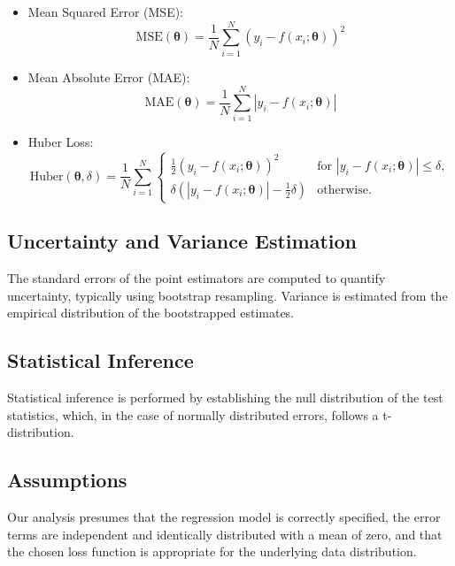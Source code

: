 \documentclass[12pt]{article}
\begin{document}
\begin{itemize}
  \item Mean Squared Error (MSE):
  \begin{equation}
    \text{MSE}(\boldsymbol{\theta}) = \frac{1}{N} \sum_{i=1}^{N} (y_i - f(x_i; \boldsymbol{\theta}))^2
    \label{eq:mse}
  \end{equation}

  \item Mean Absolute Error (MAE):
  \begin{equation}
    \text{MAE}(\boldsymbol{\theta}) = \frac{1}{N} \sum_{i=1}^{N} \left| y_i - f(x_i; \boldsymbol{\theta}) \right|
    \label{eq:mae}
  \end{equation}

  \item Huber Loss:
  \begin{equation}
    \text{Huber}(\boldsymbol{\theta}, \delta) = \frac{1}{N} \sum_{i=1}^{N} \begin{cases} 
      \frac{1}{2}(y_i - f(x_i; \boldsymbol{\theta}))^2 & \text{for } |y_i - f(x_i; \boldsymbol{\theta})| \le \delta, \\
      \delta (|y_i - f(x_i; \boldsymbol{\theta})| - \frac{1}{2}\delta) & \text{otherwise}.
    \end{cases}
    \label{eq:huber}
  \end{equation}
\end{itemize}
\subsection{Uncertainty and Variance Estimation}
The standard errors of the point estimators are computed to quantify uncertainty, typically using bootstrap resampling. Variance is estimated from the empirical distribution of the bootstrapped estimates.

\subsection{Statistical Inference}
Statistical inference is performed by establishing the null distribution of the test statistics, which, in the case of normally distributed errors, follows a t-distribution.

\subsection{Assumptions}
Our analysis presumes that the regression model is correctly specified, the error terms are independent and identically distributed with a mean of zero, and that the chosen loss function is appropriate for the underlying data distribution.
\end{document}
